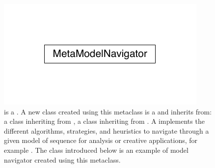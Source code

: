\documentclass[letterpaper,10pt,english]{sphinxmanual}
\begin{document}
\begin{figure}[htbp]
\centering
\capstart

\includegraphics{inheritance-14f94ff1ec9591fb712946f283f0fea99a890a19.pdf}
\caption{{\hyperref[\detokenize{index:MetaModelNavigator.MetaModelNavigator}]{}} is a . A new class created using this metaclass is a  and inherits from:  a class inheriting from {\hyperref[\detokenize{index:Model.Model}]{}},  a class inheriting from {\hyperref[\detokenize{index:Navigator.Navigator}]{}}. A  implements the different algorithms, strategies, and heuristics to navigate through a given model of sequence for analysis or creative applications, for example . The class {\hyperref[\detokenize{index:ModelNavigator.FactorOracleNavigator}]{}} introduced below is an example of model navigator created using this metaclass.}\label{\detokenize{index:id3}}\end{figure}
\end{document}

